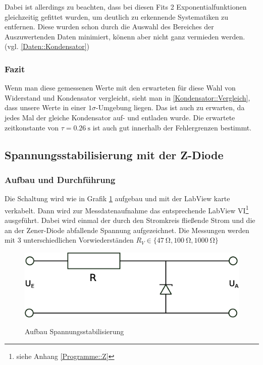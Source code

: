 \documentclass[12pt,twoside,a4paper]{scrartcl}
\begin{document}
			Dabei ist allerdings zu beachten, dass bei diesen Fits 2 Exponentialfunktionen gleichzeitig gefittet wurden, um deutlich zu erkennende Systematiken zu entfernen.  Diese wurden schon durch die Auswahl des Bereiches der Auszuwertenden Daten minimiert, könenn aber nicht ganz vermieden werden. (vgl. \ref{Daten::Kondensator})

			\subsubsection{Fazit}
				Wenn man diese gemessenen Werte mit den erwarteten für diese Wahl von Widerstand und Kondensator vergleicht, sieht man in \ref{Kondensator::Vergleich}, dass unsere Werte in einer $1 \sigma$-Umgebung liegen. Das ist auch zu erwarten, da jedes Mal der gleiche Kondensator auf- und entladen wurde.
				Die erwartete zeitkonstante von $\tau = \SI{0.26}{\second}$ ist auch gut innerhalb der Fehlergrenzen bestimmt.

	\subsection{Spannungsstabilisierung mit der Z-Diode}

		\subsubsection{Aufbau und Durchführung}

			Die Schaltung wird wie in Grafik \ref{Aufbau::Z} aufgebau und mit der LabView karte verkabelt. Dann wird zur Messdatenaufnahme das entsprechende LabView VI\footnote{siehe Anhang \ref{Programme::Z}} ausgeführt. Dabei wird einmal der durch den Stromkreis fließende Strom und die an der Zener-Diode abfallende Spannung aufgezeichnet. Die Messungen werden mit 3 unterschiedlichen Vorwiederständen $R_V \in \{ \SI{47}{\ohm}, \SI{100}{\ohm}, \SI{1000}{\ohm} \}$

			\begin{figure}[H]
				\centering

				\includegraphics[width = 0.8 \textwidth]{Pictures/zener}
				\label{Aufbau::Z}
				\caption{Aufbau Spannungsstabilisierung}
			\end{figure}
\end{document}
